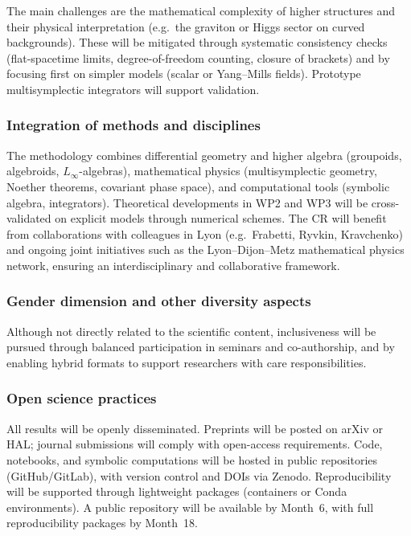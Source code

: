\documentclass[11pt]{msca-pf}
\begin{document}
The main challenges are the mathematical complexity of higher structures and their physical interpretation (e.g.\ the graviton or Higgs sector on curved backgrounds). These will be mitigated through systematic consistency checks (flat-spacetime limits, degree-of-freedom counting, closure of brackets) and by focusing first on simpler models (scalar or Yang–Mills fields). Prototype multisymplectic integrators will support validation.

\subsubsection*{Integration of methods and disciplines}
The methodology combines differential geometry and higher algebra (groupoids, algebroids, $L_\infty$-algebras), mathematical physics (multisymplectic geometry, Noether theorems, covariant phase space), and computational tools (symbolic algebra, integrators). Theoretical developments in WP2 and WP3 will be cross-validated on explicit models through numerical schemes. The CR will benefit from collaborations with colleagues in Lyon (e.g.\ Frabetti, Ryvkin, Kravchenko) and ongoing joint initiatives such as the Lyon–Dijon–Metz mathematical physics network, ensuring an interdisciplinary and collaborative framework.

\subsubsection*{Gender dimension and other diversity aspects}
Although not directly related to the scientific content, inclusiveness will be pursued through balanced participation in seminars and co-authorship, and by enabling hybrid formats to support researchers with care responsibilities.

\subsubsection*{Open science practices}
All results will be openly disseminated. Preprints will be posted on arXiv or HAL; journal submissions will comply with open-access requirements. Code, notebooks, and symbolic computations will be hosted in public repositories (GitHub/GitLab), with version control and DOIs via Zenodo. Reproducibility will be supported through lightweight packages (containers or Conda environments). A public repository will be available by Month~6, with full reproducibility packages by Month~18. 
\end{document}
